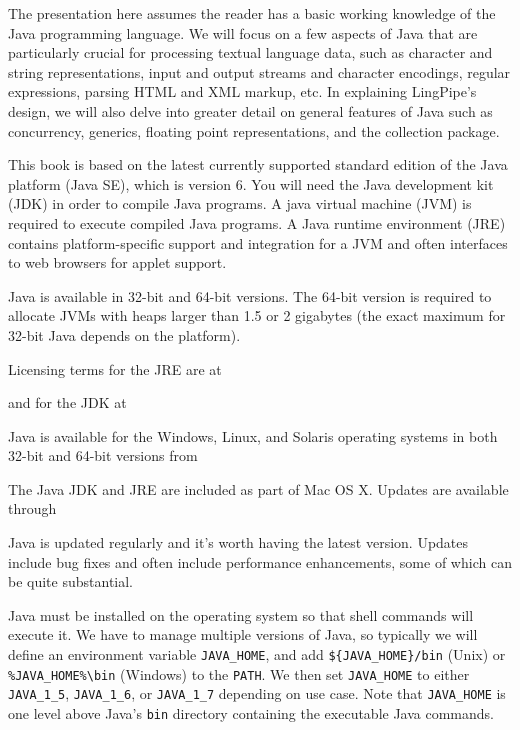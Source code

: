 The presentation here assumes the reader has a basic working knowledge
of the Java programming language.  We will focus on a few aspects of
Java that are particularly crucial for processing textual language
data, such as character and string representations, input and output
streams and character encodings, regular expressions, parsing HTML and
XML markup, etc.  In explaining LingPipe's design, we will also delve
into greater detail on general features of Java such as concurrency,
generics, floating point representations, and the collection package.

This book is based on the latest currently supported standard edition
of the Java platform (Java SE), which is version 6.  You will need the
Java development kit (JDK) in order to compile Java programs.  A java
virtual machine (JVM) is required to execute compiled Java programs.
A Java runtime environment (JRE) contains platform-specific support
and integration for a JVM and often interfaces to web browsers for
applet support.

Java is available in 32-bit and 64-bit versions.  The 64-bit version
is required to allocate JVMs with heaps larger than 1.5 or 2 gigabytes
(the exact maximum for 32-bit Java depends on the platform).  


Licensing terms for the JRE are at
%
\begin{quote}
\end{quote}
and for the JDK at
%
\begin{quote}
\end{quote}

Java is available for the Windows, Linux, and Solaris operating
systems in both 32-bit and 64-bit versions from
%
\begin{quote}
\end{quote}
%
The Java JDK and JRE are included as part of Mac OS X.  Updates are
available through
%
\begin{quote}
\end{quote}
%
Java is updated regularly and it's worth having the latest version.
Updates include bug fixes and often include performance enhancements,
some of which can be quite substantial.

Java must be installed on the operating system so that shell commands
will execute it.  We have to manage multiple versions of Java, so
typically we will define an environment variable {\tt JAVA\_HOME}, and
add {\tt \$\{JAVA\_HOME\}/bin} (Unix) or {\tt \%JAVA\_HOME\%{\textbackslash}bin} (Windows) 
to the {\tt PATH}.  We then set {\tt JAVA\_HOME} to either {\tt
JAVA\_1\_5}, {\tt JAVA\_1\_6}, or {\tt JAVA\_1\_7} depending on use
case.  Note that {\tt JAVA\_HOME} is one level above Java's {\tt bin}
directory containing the executable Java commands.

